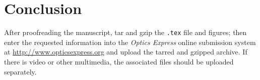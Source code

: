 \documentclass[10pt,letterpaper]{article}
\begin{document}
\section{Conclusion}
After proofreading the manuscript, tar and gzip the \texttt{.tex} file and
figures; then enter the requested information into the \textit{Optics Express}
online submission system at \url{http://www.opticsexpress.org} and upload the tarred and gzipped archive. If there is video or other multimedia, the associated
files should be uploaded separately.
\end{document}
